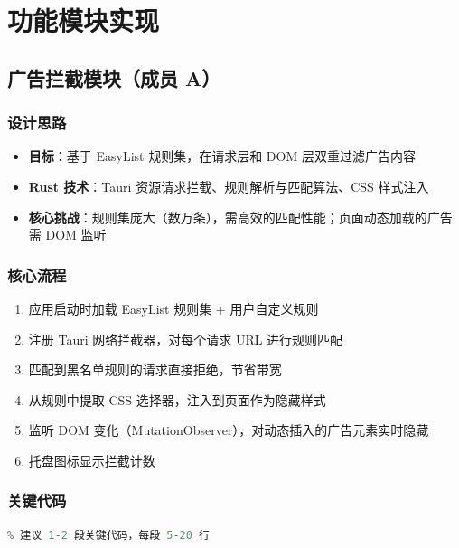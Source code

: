 \documentclass[12pt,a4paper]{ctexart}
\begin{document}
\section{功能模块实现}

\subsection{广告拦截模块（成员 A）}

\subsubsection{设计思路}

\begin{itemize}
  \item \textbf{目标}：基于 EasyList 规则集，在请求层和 DOM 层双重过滤广告内容
  \item \textbf{Rust 技术}：Tauri 资源请求拦截、规则解析与匹配算法、CSS 样式注入
  \item \textbf{核心挑战}：规则集庞大（数万条），需高效的匹配性能；页面动态加载的广告需 DOM 监听
\end{itemize}


\subsubsection{核心流程}

\begin{enumerate}[label=(\arabic*)]
  \item 应用启动时加载 EasyList 规则集 + 用户自定义规则
  \item 注册 Tauri 网络拦截器，对每个请求 URL 进行规则匹配
  \item 匹配到黑名单规则的请求直接拒绝，节省带宽
  \item 从规则中提取 CSS 选择器，注入到页面作为隐藏样式
  \item 监听 DOM 变化（MutationObserver），对动态插入的广告元素实时隐藏
  \item 托盘图标显示拦截计数
\end{enumerate}


\subsubsection{关键代码}

\begin{lstlisting}[language=Rust, caption=广告拦截示例代码]
% TODO: 成员 A 插入核心代码片段（网络拦截器注册、规则匹配、DOM 注入等）
% 建议 1-2 段关键代码，每段 5-20 行
\end{lstlisting}
\end{document}
